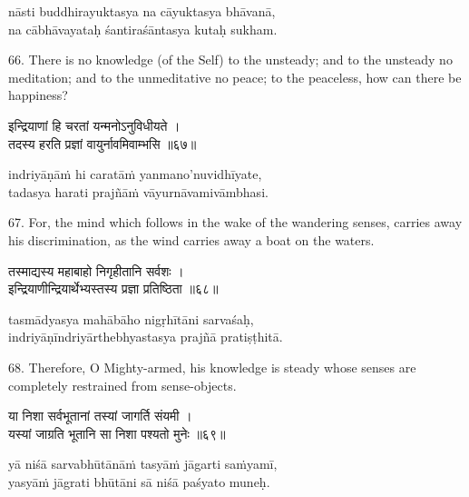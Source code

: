 \begin{transliteration}
nāsti buddhirayuktasya na cāyuktasya bhāvanā, \\
na cābhāvayataḥ śantiraśāntasya kutaḥ sukham.
\end{transliteration}

66. There is no knowledge (of the Self) to the unsteady; and to the unsteady no
meditation; and to the unmeditative no peace; to the peaceless, how can there
be happiness?

\begin{gitaverse}
इन्द्रियाणां हि चरतां यन्मनोऽनुविधीयते । \\
तदस्य हरति प्रज्ञां वायुर्नावमिवाम्भसि ॥६७॥
\end{gitaverse}

\begin{transliteration}
indriyāṇāṁ hi caratāṁ yanmano'nuvidhīyate, \\
tadasya harati prajñāṁ vāyurnāvamivāmbhasi.
\end{transliteration}

67. For, the mind which follows in the wake of the wandering senses, carries
away his discrimination, as the wind carries away a boat on the waters.

\begin{gitaverse}
तस्माद्यस्य महाबाहो निगृहीतानि सर्वशः । \\
इन्द्रियाणीन्द्रियार्थेभ्यस्तस्य प्रज्ञा प्रतिष्ठिता ॥६८॥
\end{gitaverse}

\begin{transliteration}
tasmādyasya mahābāho nigṛhītāni sarvaśaḥ, \\
indriyāṇīndriyārthebhyastasya prajñā pratiṣṭhitā.
\end{transliteration}

68. Therefore, O Mighty-armed, his knowledge is steady whose senses are
completely restrained from sense-objects.

\begin{gitaverse}
या निशा सर्वभूतानां तस्यां जागर्ति संयमी । \\
यस्यां जाग्रति भूतानि सा निशा पश्यतो मुनेः ॥६९॥
\end{gitaverse}

\begin{transliteration}
yā niśā sarvabhūtānāṁ tasyāṁ jāgarti saṁyamī, \\
yasyāṁ jāgrati bhūtāni sā niśā paśyato muneḥ.
\end{transliteration}

